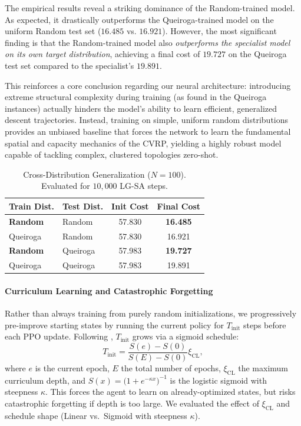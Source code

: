 \documentclass[letterpaper]{article} %
\begin{document}
The empirical results reveal a striking dominance of the Random-trained model. As expected, it drastically outperforms the Queiroga-trained model on the uniform Random test set ($16.485$ vs. $16.921$). However, the most significant finding is that the Random-trained model also \textit{outperforms the specialist model on its own target distribution}, achieving a final cost of $19.727$ on the Queiroga test set compared to the specialist's $19.891$. 

This reinforces a core conclusion regarding our neural architecture: introducing extreme structural complexity during training (as found in the Queiroga instances) actually hinders the model's ability to learn efficient, generalized descent trajectories. Instead, training on simple, uniform random distributions provides an unbiased baseline that forces the network to learn the fundamental spatial and capacity mechanics of the CVRP, yielding a highly robust model capable of tackling complex, clustered topologies zero-shot.

\begin{table}[t]
\centering
\small
\caption{Cross-Distribution Generalization ($N=100$). Evaluated for $10{,}000$ LG-SA steps.}
\label{tab:data_generalization}
\begin{tabular}{l l c c}
\toprule
\textbf{Train Dist.} & \textbf{Test Dist.} & \textbf{Init Cost} & \textbf{Final Cost} \\
\midrule
\textbf{Random} & Random & 57.830 & \textbf{16.485} \\
Queiroga & Random & 57.830 & 16.921 \\
\midrule
\textbf{Random} & Queiroga & 57.983 & \textbf{19.727} \\
Queiroga & Queiroga & 57.983 & 19.891 \\
\bottomrule
\end{tabular}
\end{table}

\paragraph{Curriculum Learning and Catastrophic Forgetting}
Rather than always training from purely random initializations, we progressively pre-improve starting states by running the current policy for $T_{\text{init}}$ steps before each PPO update. Following \citet{ma_learning_2021}, $T_{\text{init}}$ grows via a sigmoid schedule:
\begin{equation}
    T_{\text{init}} = \frac{S(e) - S(0)}{S(E) - S(0)} \xi_{\text{CL}},
\end{equation}
where $e$ is the current epoch, $E$ the total number of epochs, $\xi_{\text{CL}}$ the maximum curriculum depth, and $S(x) = \bigl(1 + e^{-\kappa x}\bigr)^{-1}$ is the logistic sigmoid with steepness $\kappa$. This forces the agent to learn on already-optimized states, but risks catastrophic forgetting if depth is too large. We evaluated the effect of $\xi_{\text{CL}}$ and schedule shape (Linear vs.\ Sigmoid with steepness $\kappa$).
\end{document}
